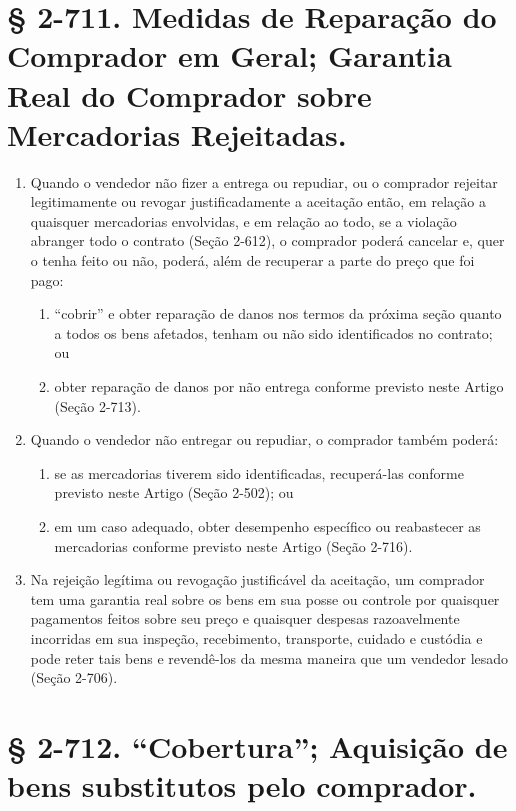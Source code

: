 \documentclass[a5paper,10pt]{book}
\begin{document}
\section{§ 2-711. Medidas de Reparação do Comprador em Geral; Garantia Real do Comprador sobre Mercadorias Rejeitadas.}

\begin{enumerate}[label=(\arabic*)]
	\item Quando o vendedor não fizer a entrega ou repudiar, ou o comprador rejeitar legitimamente ou revogar justificadamente a aceitação então, em relação a quaisquer mercadorias envolvidas, e em relação ao todo, se a violação abranger todo o contrato (Seção 2-612), o comprador poderá cancelar e, quer o tenha feito ou não, poderá, além de recuperar a parte do preço que foi pago:
	\begin{enumerate}
		\item ``cobrir'' e obter reparação de danos nos termos da próxima seção quanto a todos os bens afetados, tenham ou não sido identificados no contrato; ou
		\item obter reparação de danos por não entrega conforme previsto neste Artigo (Seção 2-713).
	\end{enumerate}
	\item Quando o vendedor não entregar ou repudiar, o comprador também poderá:
	\begin{enumerate}
		\item se as mercadorias tiverem sido identificadas, recuperá-las conforme previsto neste Artigo (Seção 2-502); ou
		\item em um caso adequado, obter desempenho específico ou reabastecer as mercadorias conforme previsto neste Artigo (Seção 2-716).
	\end{enumerate}
	\item Na rejeição legítima ou revogação justificável da aceitação, um comprador tem uma garantia real sobre os bens em sua posse ou controle por quaisquer pagamentos feitos sobre seu preço e quaisquer despesas razoavelmente incorridas em sua inspeção, recebimento, transporte, cuidado e custódia e pode reter tais bens e revendê-los da mesma maneira que um vendedor lesado (Seção 2-706).
\end{enumerate}

\section{§ 2-712. ``Cobertura''; Aquisição de bens substitutos pelo comprador.}
\end{document}
